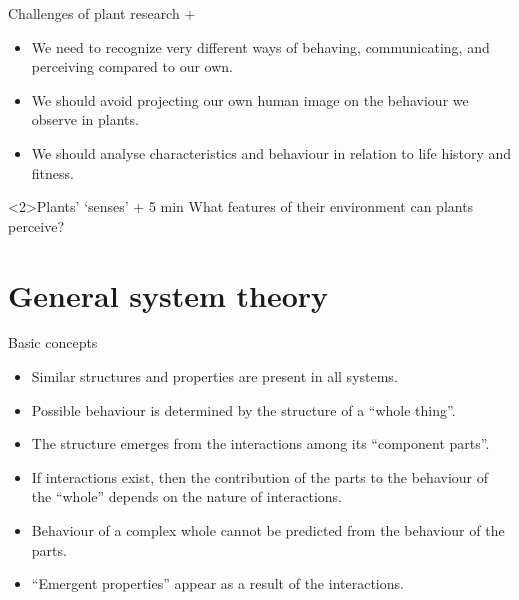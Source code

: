 \documentclass[10pt]{beamer}
\begin{document}
\begin{frame}{Challenges of plant research + \Discussion}

\begin{itemize}
    \item<1-2> We need to recognize very different ways of behaving, communicating, and perceiving compared to our own.
    \item<1-2> We should avoid projecting our own human image on the behaviour we observe in plants.
    \item<1-2> We should analyse characteristics and behaviour in relation to life history and fitness.
\end{itemize}

\begin{alertblock}<2>{Plants' `senses'  + 5 min}
  \vspace{0.5ex}
  What features of their environment can plants perceive?\\
\end{alertblock}

\end{frame}

\section{General system theory}
\nocite{Meadows2008,Jones2015}

\begin{frame}{Basic concepts}
  \begin{itemize}
    \item Similar structures and properties are present in all systems.
    \item Possible behaviour is determined by the structure of a ``whole thing''.
    \item The structure emerges from the interactions among its ``component parts''.
    \item If interactions exist, then the contribution of the parts to the behaviour of the ``whole'' depends on the nature of interactions.
    \item Behaviour of a complex whole cannot be predicted from the behaviour of the parts.
    \item ``Emergent properties'' appear as a result of the interactions.
  \end{itemize}
\end{frame}
\end{document}
